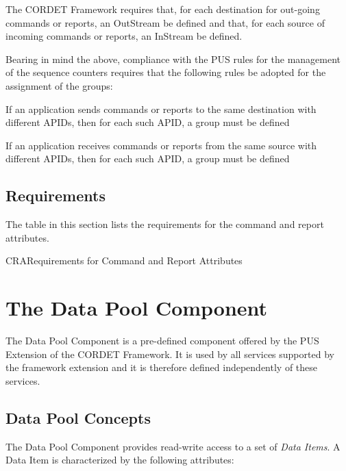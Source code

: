 \documentclass[a4paper,10pt]{article}
\let\stdsection\section
\renewcommand\section{\newpage\stdsection}
\newenvironment{fw_itemize}						%
{\begin{itemize}
  \setlength{\itemsep}{1mm}
  \setlength{\parskip}{0pt}
  \setlength{\parsep}{0pt}}
{\end{itemize}}
\newenvironment{cr_req}[2]
{
\begin{longtable}{|l|p{11.8cm}|}
\caption{#2}\label{tab:Req-#1} \\
\hline
\rowcolor{light-gray}
\textbf{Req. ID} & \textbf{Requirement Text}\\
\hline\hline
\endfirsthead
\rowcolor{light-gray}
\textbf{Req. ID} & \textbf{Requirement Text}\\
\hline\hline
\endhead
\DTLforeach*[\DTLiseq{\cat}{#1}]{dbReq}{\cat=Category,\type=Type,\id=Id,\reqText=Text}
{\DTLiffirstrow{}{\\\hline}P-\cat-\id/\type & \textit{\reqText}}\\\hline
}
{\end{longtable}}
\begin{document}
The CORDET Framework requires that, for each destination for out-going commands or reports, an OutStream be defined and that, for each source of incoming commands or reports, an InStream be defined. 

Bearing in mind the above, compliance with the PUS rules for the management of the sequence counters requires that the following rules be adopted for the assignment of the groups: 

\begin{fw_itemize}
\item If an application sends commands or reports to the same destination with different APIDs, then for each such APID, a group must be defined
\item If an application receives commands or reports from the same source  with different APIDs, then for each such APID, a group must be defined
\end{fw_itemize}


\newpage
\subsection{Requirements}
The table in this section lists the requirements for the command and report attributes.

\begin{cr_req}{CRA}{Requirements for Command and Report Attributes}
\end{cr_req}
 

\section{The Data Pool Component}\label{sec:dp}
The Data Pool Component is a pre-defined component offered by the PUS Extension of the CORDET Framework. It is used by all services supported by the framework extension and it is therefore defined independently of these services.

\subsection{Data Pool Concepts}\label{sec:dpConcepts}
The Data Pool Component provides read-write access to a set of \textit{Data Items}. A Data Item is characterized by the following attributes: 
\end{document}
